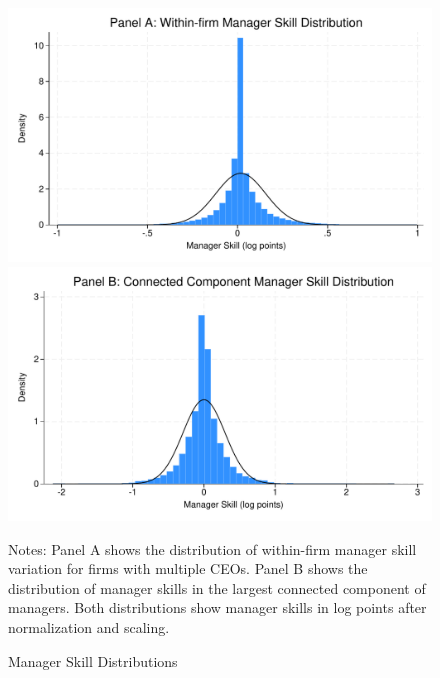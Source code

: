 \documentclass[11pt,a4paper]{article}
\begin{document}


\begin{figure}[htbp]
\centering
\begin{minipage}{0.48\textwidth}
\centering
\includegraphics[width=\textwidth]{figure/manager_skill_within.pdf}
\end{minipage}
\hfill
\begin{minipage}{0.48\textwidth}
\centering
\includegraphics[width=\textwidth]{figure/manager_skill_connected.pdf}
\end{minipage}
\caption{Manager Skill Distributions}
\label{fig:manager_skills_appendix}
\footnotesize
Notes: Panel A shows the distribution of within-firm manager skill variation for firms with multiple CEOs. Panel B shows the distribution of manager skills in the largest connected component of managers. Both distributions show manager skills in log points after normalization and scaling.
\end{figure}


\end{document}
